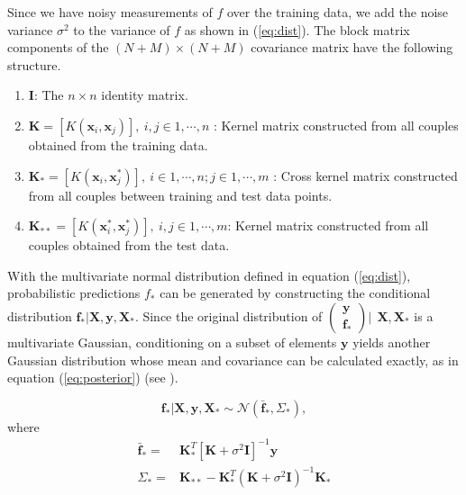 \documentclass[sw, draft]{AGUTeX}
\begin{document}
\begin{article}
Since we have noisy measurements of $f$ over the training data, we add the noise variance $\sigma^2$ to the variance of $f$ as shown in (\ref{eq:dist}). The block matrix components of the $(N+M) \times (N+M)$ covariance matrix have the following structure.

\begin{enumerate}
      \item $\mathbf{I}$: The $n \times n$ identity matrix.
      \item $\mathbf{K} = [K(\mathbf{x}_i, \mathbf{x}_j)], \ i,j \in 1,\cdots,n$ : Kernel matrix constructed from all couples obtained from the training data.
      \item $\mathbf{K}_{*} = [K(\mathbf{x}_i, \mathbf{x}^{*}_j)], \ i \in 1,\cdots,n ; j \in 1,\cdots,m$ : Cross kernel matrix constructed from all couples between training and test data points.
      \item $\mathbf{K}_{**} = [K(\mathbf{x}^{*}_i, \mathbf{x}^{*}_j)], \ i,j \in 1,\cdots,m$: Kernel matrix constructed from all couples obtained from the test data.
\end{enumerate}

With the multivariate normal distribution defined in equation (\ref{eq:dist}), probabilistic predictions $f_*$ can be generated by constructing the conditional distribution $\mathbf{f_*}|\mathbf{X},\mathbf{y},\mathbf{X_*}$. Since the original distribution of $\left( \begin{array}{c} \mathbf{y} \\ \mathbf{f_*} \end{array} \right) | \ \ \mathbf{X}, \mathbf{X}_*$ is a multivariate Gaussian, conditioning on a subset of elements $\mathbf{y}$ yields another Gaussian distribution whose mean and covariance can be calculated exactly, as in equation (\ref{eq:posterior}) (see \citet{Rasmussen:2005:GPM:1162254}).

\begin{equation}
    \mathbf{f_*}|\mathbf{X},\mathbf{y},\mathbf{X_*} \sim \mathcal{N}(\mathbf{\bar{f}_*}, \Sigma_*)  \label{eq:posterior},
\end{equation}
where
\begin{align}
    \mathbf{\bar{f}_*} = & \mathbf{K}^T_{*} [\mathbf{K} + \sigma^{2} \mathbf{I}]^{-1} \mathbf{y} \label{eq:posteriormean} \\
    \Sigma_* = & \mathbf{K}_{**} - \mathbf{K}^T_{*} \left(\mathbf{K} + \sigma^{2} \mathbf{I}\right)^{-1} \mathbf{K}_{*} \label{eq:posteriorcov}
\end{align}


\end{article}
\end{document}
